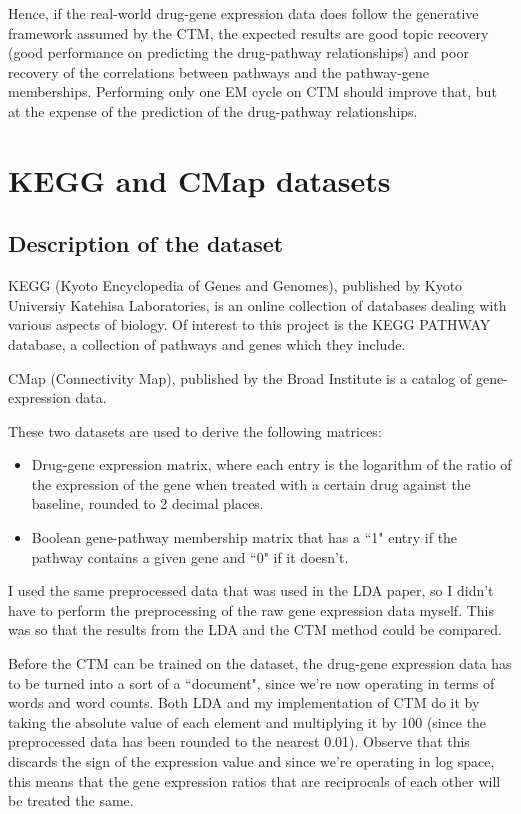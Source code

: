 \documentclass[12pt,a4paper,twoside,openright]{report}
\begin{document}
Hence, if the real-world drug-gene expression data does follow the generative framework assumed by the CTM, the expected results are good topic recovery (good performance on predicting the drug-pathway relationships) and poor recovery of the correlations between pathways and the pathway-gene memberships. Performing only one EM cycle on CTM should improve that, but at the expense of the prediction of the drug-pathway relationships.

\section{KEGG and CMap datasets}

\subsection{Description of the dataset}

KEGG (Kyoto Encyclopedia of Genes and Genomes), published by Kyoto Universiy Katehisa Laboratories, is an online collection of databases dealing with various aspects of biology. Of interest to this project is the KEGG PATHWAY database, a collection of pathways and genes which they include.

CMap (Connectivity Map), published by the Broad Institute is a catalog of gene-expression data.

These two datasets are used to derive the following matrices:

\begin{itemize}[noitemsep]
\item Drug-gene expression matrix, where each entry is the logarithm of the ratio of the expression of the gene when treated with a certain drug against the baseline, rounded to 2 decimal places.
\item Boolean gene-pathway membership matrix that has a ``1" entry if the pathway contains a given gene and ``0" if it doesn't.
\end{itemize}

I used the same preprocessed data that was used in the LDA paper, so I didn't have to perform the preprocessing of the raw gene expression data myself. This was so that the results from the LDA and the CTM method could be compared.

Before the CTM can be trained on the dataset, the drug-gene expression data has to be turned into a sort of a ``document", since we're now operating in terms of words and word counts. Both LDA and my implementation of CTM do it by taking the absolute value of each element and multiplying it by 100 (since the preprocessed data has been rounded to the nearest 0.01). Observe that this discards the sign of the expression value and since we're operating in log space, this means that the gene expression ratios that are reciprocals of each other will be treated the same.
\end{document}
